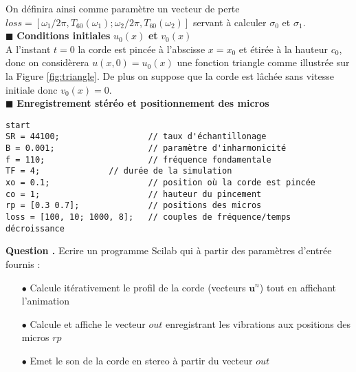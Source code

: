 \documentclass[a4,12pt]{article}
\newcommand{\ub}{\mathbf{u}}
\newcounter{Nbquestion}
\newcommand*\question{%
\stepcounter{Nbquestion}%
\textbf{Question \theNbquestion. }}
\begin{document}

On définira ainsi comme paramètre un vecteur de perte $loss=[\omega_1/2\pi,T_{60}(\omega_1) ; \omega_2/2\pi,T_{60}(\omega_2)]$ servant à calculer $\sigma_0$ et $\sigma_1$. \\

\hspace{0.5cm} $\blacksquare$ \textbf{Conditions initiales} $u_0(x)$ \textbf{et} $v_0(x)$\\

A l'instant $t=0$ la corde est pincée à l'abscisse $x=x_0$ et étirée à la hauteur $c_0$, donc on considèrera $u(x,0)=u_0(x)$ une fonction triangle comme illustrée sur la Figure \ref{fig:triangle}. De plus on suppose que la corde est lâchée sans vitesse initiale donc $v_0(x)=0$.\\


\hspace{0.5cm} $\blacksquare$ \textbf{Enregistrement stéréo et positionnement des micros}\\


\begin{lstlisting}[frame=single,caption=Paramètres d'entrée]  
start
SR = 44100;                  // taux d'échantillonage 
B = 0.001;                   // paramètre d'inharmonicité
f = 110;                     // fréquence fondamentale
TF = 4;			     // durée de la simulation
xo = 0.1;                    // position où la corde est pincée
co = 1;                      // hauteur du pincement
rp = [0.3 0.7];              // positions des micros
loss = [100, 10; 1000, 8];   // couples de fréquence/temps décroissance
\end{lstlisting}


  \question Ecrire un programme Scilab qui à partir des paramètres d'entrée fournis : \\

  \begin{itemize}
    \item[$\bullet$] Calcule itérativement le profil de la corde (vecteurs $\ub^n$) tout en affichant l'animation\\
    \item[$\bullet$] Calcule et affiche le vecteur $out$ enregistrant les vibrations aux positions des micros $rp$\\ 	\item[$\bullet$] Emet le son de la corde en stereo à partir du vecteur $out$
  \end{itemize}
\end{document}
